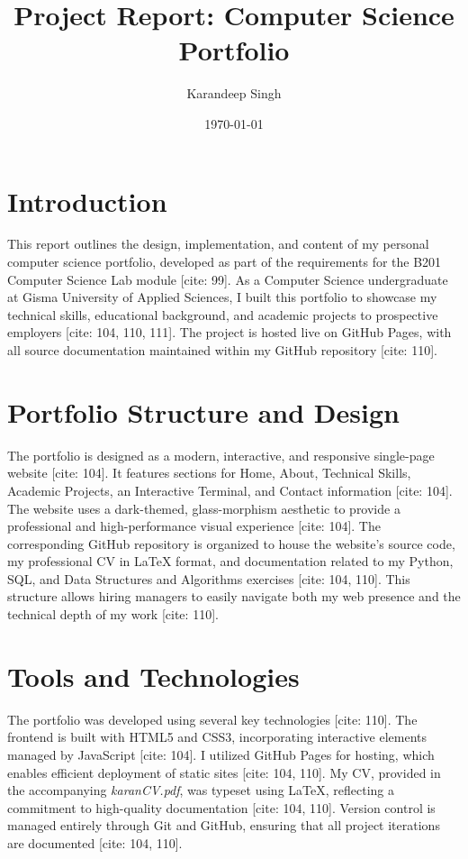 \documentclass{article}
\title{Project Report: Computer Science Portfolio}
\author{Karandeep Singh}
\date{\today}
\begin{document}
\maketitle

\section{Introduction}
This report outlines the design, implementation, and content of my personal computer science portfolio, developed as part of the requirements for the B201 Computer Science Lab module [cite: 99]. As a Computer Science undergraduate at Gisma University of Applied Sciences, I built this portfolio to showcase my technical skills, educational background, and academic projects to prospective employers [cite: 104, 110, 111]. The project is hosted live on GitHub Pages, with all source documentation maintained within my GitHub repository [cite: 110].

\section{Portfolio Structure and Design}
The portfolio is designed as a modern, interactive, and responsive single-page website [cite: 104]. It features sections for Home, About, Technical Skills, Academic Projects, an Interactive Terminal, and Contact information [cite: 104]. The website uses a dark-themed, glass-morphism aesthetic to provide a professional and high-performance visual experience [cite: 104]. The corresponding GitHub repository is organized to house the website's source code, my professional CV in LaTeX format, and documentation related to my Python, SQL, and Data Structures and Algorithms exercises [cite: 104, 110]. This structure allows hiring managers to easily navigate both my web presence and the technical depth of my work [cite: 110].

\section{Tools and Technologies}
The portfolio was developed using several key technologies [cite: 110]. The frontend is built with HTML5 and CSS3, incorporating interactive elements managed by JavaScript [cite: 104]. I utilized GitHub Pages for hosting, which enables efficient deployment of static sites [cite: 104, 110]. My CV, provided in the accompanying \textit{karanCV.pdf}, was typeset using LaTeX, reflecting a commitment to high-quality documentation [cite: 104, 110]. Version control is managed entirely through Git and GitHub, ensuring that all project iterations are documented [cite: 104, 110].
\end{document}
